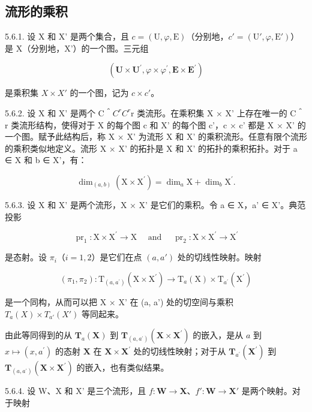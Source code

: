 \subsection{流形的乘积}

5.6.1. 设 X 和 X' 是两个集合，且 \(c = (\mathrm{U}, \varphi, \mathrm{E})\)（分别地，\(c' = (\mathrm{U}', \varphi, \mathrm{E}')\)）是 X（分别地，X'）的一个图。三元组

\[
(\mathbf {U} \times \mathbf {U} ^ {\prime}, \varphi \times \varphi^ {\prime}, \mathbf {E} \times \mathbf {E} ^ {\prime})
\]

是乘积集 \(X \times X'\) 的一个图，记为 \(c \times c'\)。

5.6.2. 设 X 和 X' 是两个 C＾\(C^{r}\)\(C^{r}\)r 类流形。在乘积集 X × X' 上存在唯一的 C＾r 类流形结构，使得对于 X 的每个图 c 和 X' 的每个图 c'，c × c' 都是 X × X' 的一个图。赋予此结构后，称 X × X' 为流形 X 和 X' 的乘积流形。任意有限个流形的乘积类似地定义。流形 X × X' 的拓扑是 X 和 X' 的拓扑的乘积拓扑。对于 a ∈ X 和 b ∈ X'，有：

\[
\dim_ {(a, b)} (\mathrm{X} \times \mathrm{X} ^ {\prime}) = \dim_ {a} \mathrm{X} + \dim_ {b} \mathrm{X} ^ {\prime}.
\]

5.6.3. 设 X 和 X' 是两个流形，X × X' 是它们的乘积。令 a ∈ X，a' ∈ X'。典范投影

\[
\operatorname{pr} _ {1}: \mathrm{X} \times \mathrm{X} ^ {\prime} \rightarrow \mathrm{X} \quad \text { and } \quad \operatorname{pr} _ {2}: \mathrm{X} \times \mathrm{X} ^ {\prime} \rightarrow \mathrm{X} ^ {\prime}
\]

是态射。设 \(\pi_{i}\)（\(i=1,2\)）是它们在点 \((a,a')\) 处的切线性映射。映射

\[
(\pi_ {1}, \pi_ {2}): \mathrm{T} _ {(a, a ^ {\prime})} (\mathrm{X} \times \mathrm{X} ^ {\prime}) \rightarrow \mathrm{T} _ {a} (\mathrm{X}) \times \mathrm{T} _ {a ^ {\prime}} (\mathrm{X} ^ {\prime})
\]

是一个同构，从而可以把 X × X' 在 (a, a') 处的切空间与乘积 \(T_{a}(X) \times T_{a'}(X')\) 等同起来。

由此等同得到的从 \(\mathbf{T}_{a}(\mathbf{X})\) 到 \(\mathbf{T}_{(a,a^{\prime})}(\mathbf{X}\times \mathbf{X}^{\prime})\) 的嵌入，是从 \(a\) 到 \(x\mapsto (x,a^{\prime})\) 的态射 \(\mathbf{X}\) 在 \(\mathbf{X}\times \mathbf{X}^{\prime}\) 处的切线性映射；对于从 \(\mathbf{T}_{a^{\prime}}(\mathbf{X}^{\prime})\) 到 \(\mathbf{T}_{(a,a^{\prime})}(\mathbf{X}\times \mathbf{X}^{\prime})\) 的嵌入，也有类似结果。

5.6.4. 设 W、X 和 X' 是三个流形，且 \(f: \mathbf{W} \to \mathbf{X}\)、\(f': \mathbf{W} \to \mathbf{X'}\) 是两个映射。对于映射


